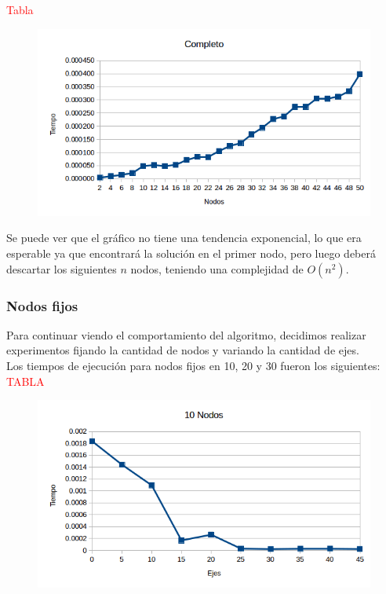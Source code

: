 \textcolor{red}{Tabla}

  \begin{figure}[h!]
   \begin{center}
 	\includegraphics[scale=0.7]{imagenes/exacto/Completos.png}
	\label{GrafoCompleto}
   \end{center}
 \end{figure}

Se puede ver que el gr\'afico no tiene una tendencia exponencial, lo que era esperable ya que encontrar\'a la soluci\'on en el primer nodo, pero luego deber\'a descartar los siguientes $n$ nodos,
teniendo una complejidad de $O(n^2)$.\\

\newpage

\subsubsection{Nodos fijos}
Para continuar viendo el comportamiento del algoritmo, decidimos realizar experimentos fijando la cantidad de nodos y variando la cantidad de ejes.\\

Los tiempos de ejecuci\'on para nodos fijos en 10, 20 y 30 fueron los siguientes:\\
\textcolor{red}{TABLA}

  \begin{figure}[h!]
   \begin{center}
 	\includegraphics[scale=0.7]{imagenes/exacto/10Nodos.png}
	\label{10Nodos}
   \end{center}
 \end{figure}

